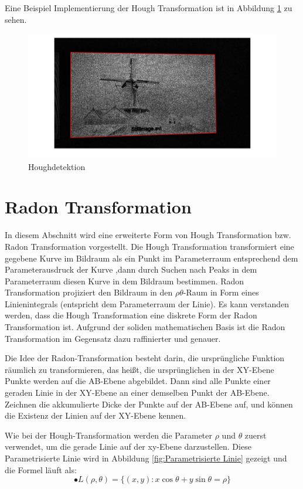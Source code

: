 Eine Beispiel Implementierung der Hough Transformation ist in Abbildung \ref{fig:Houghdetektion} zu sehen.

\begin{figure}[H]
 \centering 
  \includegraphics[keepaspectratio,width=1.0\textwidth]{images/4_ZweiteErfahrung/Hough/Houghdetektion.pdf}
 \caption{Houghdetektion}
 \label{fig:Houghdetektion}
\end{figure}

\section{Radon Transformation}
In diesem Abschnitt wird eine erweiterte Form von Hough Transformation bzw. Radon Transformation vorgestellt. Die Hough Transformation transformiert eine gegebene Kurve im Bildraum als ein Punkt im Parameterraum entsprechend dem Parameterausdruck der Kurve ,dann durch Suchen nach Peaks in dem Parameterraum diesen Kurve in dem Bildraum bestimmen. Radon Transformation projiziert den Bildraum in den $ \rho \theta $-Raum in Form eines Linienintegrals (entspricht dem Parameterraum der Linie). Es kann verstanden werden, dass die Hough Transformation eine diskrete Form der Radon Transformation ist. Aufgrund der soliden mathematischen Basis ist die Radon Transformation  im Gegensatz dazu raffinierter und genauer.

Die Idee der Radon-Transformation besteht darin, die ursprüngliche Funktion räumlich zu transformieren, das heißt, die ursprünglichen in der XY-Ebene Punkte werden auf die AB-Ebene abgebildet. Dann sind alle Punkte einer geraden Linie in der XY-Ebene an einer demselben Punkt der AB-Ebene. Zeichnen die akkumulierte Dicke der Punkte auf der AB-Ebene auf, und können die Existenz der Linien auf der XY-Ebene kennen.

Wie bei der Hough-Transformation werden die Parameter $ \rho $ und $ \theta $ zuerst verwendet, um die gerade Linie auf der xy-Ebene darzustellen. Diese Parametrisierte Linie wird in Abbildung \ref{fig:Parametrisierte Linie} gezeigt und die Formel läuft als:
\begin{equation}
•  L(\rho,\theta)=\lbrace(x,y):x\cos{\theta} + y\sin{\theta} = \rho\rbrace
\end{equation} 

